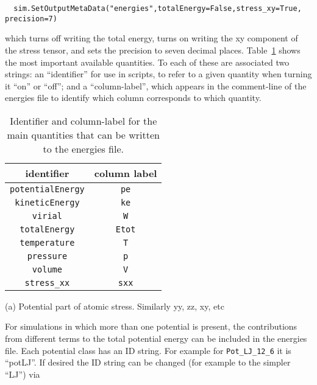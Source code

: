 \begin{verbatim}
  sim.SetOutputMetaData("energies",totalEnergy=False,stress_xy=True, precision=7)
\end{verbatim}
which turns off writing the total energy, turns on writing the xy component
of the stress tensor, and sets the precision to seven decimal places. 
Table~\ref{energyQuantities} shows the most important available
quantities. To each of these are associated two strings: an ``identifier'' for
use in scripts, to refer to a given quantity when turning it ``on'' or ``off'';
and a ``column-label'', which appears in the comment-line of the energies file
to identify which column corresponds to which quantity.

\begin{table}
  \caption{\label{energyQuantities}Identifier and column-label for the main
    quantities that can be written to the energies file.}
  \begin{center}
    \begin{threeparttable}
      \begin{tabular}{|c|c|}
        \hline
        identifier & column label \\
        \hline
        \verb|potentialEnergy| & \verb|pe| \\
        \verb|kineticEnergy| & \verb|ke| \\
        \verb|virial| & \verb|W| \\
        \verb|totalEnergy| & \verb|Etot| \\
        \verb|temperature| & \verb|T| \\
        \verb|pressure| & \verb|p| \\
        \verb|volume| & \verb|V| \\
        \verb|stress_xx| & \verb|sxx| \tnote{(a)} \\
        \hline
      \end{tabular}
      \begin{tablenotes}
      \item[(a)] Potential part of atomic stress. Similarly yy, zz, xy, etc
      \end{tablenotes}
  \end{threeparttable}
  
\end{center}
\end{table}



For simulations in which more than one potential is present, 
the contributions from different terms
to the total potential energy can be included in the energies file. Each 
potential class has an ID string. For example for \verb|Pot_LJ_12_6| it is 
``potLJ''. If desired the ID string can be changed (for example to the simpler 
``LJ'') via

